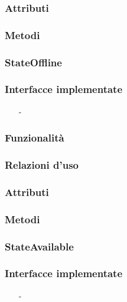 \subsubsection*{Attributi}

\subsubsection*{Metodi}

\subsubsection{StateOffline}\label{sec:stateoffline}

\subsubsection*{Interfacce implementate}
\begin{itemize}[noitemsep,nolistsep]
  \item[-]
\end{itemize}

\subsubsection*{Funzionalità}

\subsubsection*{Relazioni d'uso}

\subsubsection*{Attributi}

\subsubsection*{Metodi}

\subsubsection{StateAvailable}\label{sec:stateavailable}

\subsubsection*{Interfacce implementate}
\begin{itemize}[noitemsep,nolistsep]
  \item[-]
\end{itemize}

